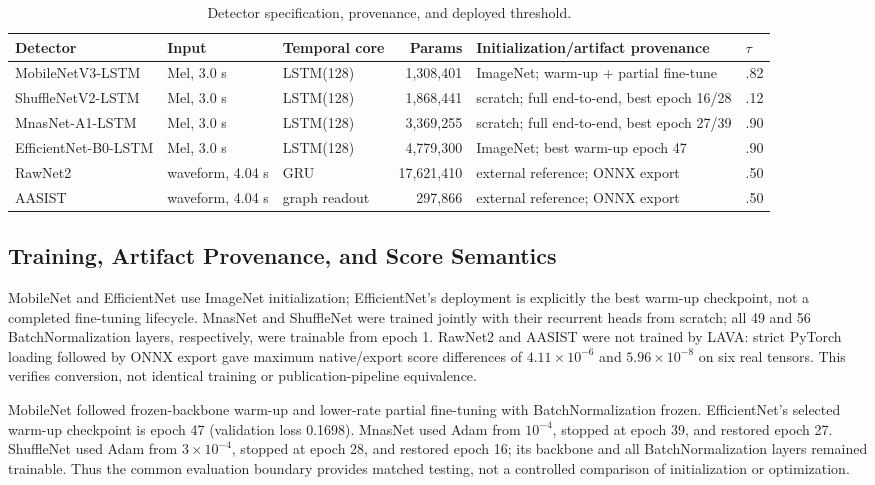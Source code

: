 \documentclass[10pt,journal,onecolumn,a4paper]{IEEEtran}
\begin{document}
\begin{table}[!t]
\centering\scriptsize
\caption{Detector specification, provenance, and deployed threshold.}
\label{tab:models}
\begin{tabularx}{\textwidth}{l l l r Y l}
\toprule
Detector & Input & Temporal core & Params & Initialization/artifact provenance & $\tau$ \\
\midrule
MobileNetV3-LSTM & Mel, 3.0 s & LSTM(128) & 1,308,401 & ImageNet; warm-up + partial fine-tune & .82 \\
ShuffleNetV2-LSTM & Mel, 3.0 s & LSTM(128) & 1,868,441 & scratch; full end-to-end, best epoch 16/28 & .12 \\
MnasNet-A1-LSTM & Mel, 3.0 s & LSTM(128) & 3,369,255 & scratch; full end-to-end, best epoch 27/39 & .90 \\
EfficientNet-B0-LSTM & Mel, 3.0 s & LSTM(128) & 4,779,300 & ImageNet; best warm-up epoch 47 & .90 \\
RawNet2 & waveform, 4.04 s & GRU & 17,621,410 & external reference; ONNX export & .50 \\
AASIST & waveform, 4.04 s & graph readout & 297,866 & external reference; ONNX export & .50 \\
\bottomrule
\end{tabularx}
\end{table}

\subsection{Training, Artifact Provenance, and Score Semantics}
MobileNet and EfficientNet use ImageNet initialization; EfficientNet's deployment is explicitly the best warm-up checkpoint, not a completed fine-tuning lifecycle. MnasNet and ShuffleNet were trained jointly with their recurrent heads from scratch; all 49 and 56 BatchNormalization layers, respectively, were trainable from epoch 1. RawNet2 and AASIST were not trained by LAVA: strict PyTorch loading followed by ONNX export gave maximum native/export score differences of $4.11\times10^{-6}$ and $5.96\times10^{-8}$ on six real tensors. This verifies conversion, not identical training or publication-pipeline equivalence.

MobileNet followed frozen-backbone warm-up and lower-rate partial fine-tuning with BatchNormalization frozen. EfficientNet's selected warm-up checkpoint is epoch 47 (validation loss 0.1698). MnasNet used Adam from $10^{-4}$, stopped at epoch 39, and restored epoch 27. ShuffleNet used Adam from $3\times10^{-4}$, stopped at epoch 28, and restored epoch 16; its backbone and all BatchNormalization layers remained trainable. Thus the common evaluation boundary provides matched testing, not a controlled comparison of initialization or optimization.
\end{document}
